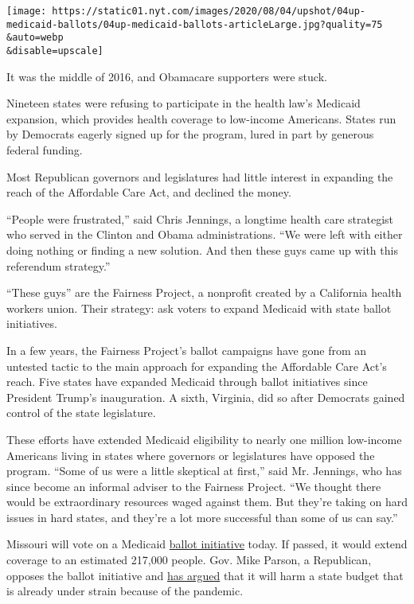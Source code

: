\texttt{[image: https://static01.nyt.com/images/2020/08/04/upshot/04up-medicaid-ballots/04up-medicaid-ballots-articleLarge.jpg?quality=75\\\&auto=webp\\\&disable=upscale]}

It was the middle of 2016, and Obamacare supporters were stuck.

Nineteen states were refusing to participate in the health law's
Medicaid expansion, which provides health coverage to low-income
Americans. States run by Democrats eagerly signed up for the program,
lured in part by generous federal funding.

Most Republican governors and legislatures had little interest in
expanding the reach of the Affordable Care Act, and declined the money.

``People were frustrated,'' said Chris Jennings, a longtime health care
strategist who served in the Clinton and Obama administrations. ``We
were left with either doing nothing or finding a new solution. And then
these guys came up with this referendum strategy.''

``These guys'' are the Fairness Project, a nonprofit created by a
California health workers union. Their strategy: ask voters to expand
Medicaid with state ballot initiatives.

In a few years, the Fairness Project's ballot campaigns have gone from
an untested tactic to the main approach for expanding the Affordable
Care Act's reach. Five states have expanded Medicaid through ballot
initiatives since President Trump's inauguration. A sixth, Virginia, did
so after Democrats gained control of the state legislature.

These efforts have extended Medicaid eligibility to nearly one million
low-income Americans living in states where governors or legislatures
have opposed the program. ``Some of us were a little skeptical at
first,'' said Mr. Jennings, who has since become an informal adviser to
the Fairness Project. ``We thought there would be extraordinary
resources waged against them. But they're taking on hard issues in hard
states, and they're a lot more successful than some of us can say.''

Missouri will vote on a Medicaid
\href{https://ballotpedia.org/Missouri_Amendment_2,_Medicaid_Expansion_Initiative_(August_2020)}{ballot
initiative} today. If passed, it would extend coverage to an estimated
217,000 people. Gov. Mike Parson, a Republican, opposes the ballot
initiative and
\href{https://www.kshb.com/news/local-news/missouri-medicaid-expansion-set-for-august-election}{has
argued} that it will harm a state budget that is already under strain
because of the pandemic.

